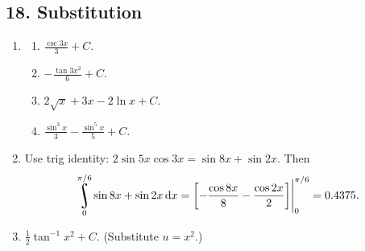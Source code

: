 \subsection*{18. Substitution}
\begin{enumerate}
  \item
    \begin{enumerate}
      \item $ \frac{\csc 3x}{3} + C $.
      \item $ -\frac{\tan 3x^2}{6} + C $.
      \item $ 2\sqrt{x} + 3x - 2\ln x + C $.
      \item $ \frac{\sin^3 x}{3} - \frac{\sin^5 x}{5} + C $.
    \end{enumerate}
  \item Use trig identity: $ 2 \sin 5x \cos 3x = \sin 8x + \sin 2x $. Then
        \begin{displaymath}
          \rint^{\pi/6}_0 \sin 8x + \sin 2x \dif{x} = \eval{\left[-\frac{\cos 8x}{8} - \frac{\cos 2x}{2}\right]}_0^{\pi/6} = 0.4375.
        \end{displaymath}
  \item $ \frac{1}{2} \tan^{-1} x^2 + C $. (Substitute $ u = x^2 $.)
\end{enumerate}

